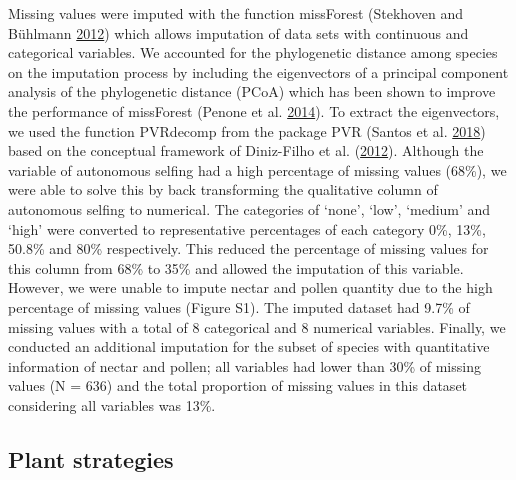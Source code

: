 \documentclass[12pt,a4paper,]{article}
\begin{document}
Missing values were imputed with the function missForest (Stekhoven and
Bühlmann \protect\hyperlink{ref-stekhoven2012}{2012}) which allows
imputation of data sets with continuous and categorical variables. We
accounted for the phylogenetic distance among species on the imputation
process by including the eigenvectors of a principal component analysis
of the phylogenetic distance (PCoA) which has been shown to improve the
performance of missForest (Penone et al.
\protect\hyperlink{ref-penone2014}{2014}). To extract the eigenvectors,
we used the function PVRdecomp from the package PVR (Santos et al.
\protect\hyperlink{ref-santos2018}{2018}) based on the conceptual
framework of Diniz-Filho et al.
(\protect\hyperlink{ref-diniz-filho2012}{2012}). Although the variable
of autonomous selfing had a high percentage of missing values (68\%), we
were able to solve this by back transforming the qualitative column of
autonomous selfing to numerical. The categories of `none', `low',
`medium' and `high' were converted to representative percentages of each
category 0\%, 13\%, 50.8\% and 80\% respectively. This reduced the
percentage of missing values for this column from 68\% to 35\% and
allowed the imputation of this variable. However, we were unable to
impute nectar and pollen quantity due to the high percentage of missing
values (Figure S1). The imputed dataset had 9.7\% of missing values with
a total of 8 categorical and 8 numerical variables. Finally, we
conducted an additional imputation for the subset of species with
quantitative information of nectar and pollen; all variables had lower
than 30\% of missing values (N = 636) and the total proportion of
missing values in this dataset considering all variables was 13\%.

\subsection{Plant strategies}\label{plant-strategies}
\end{document}
